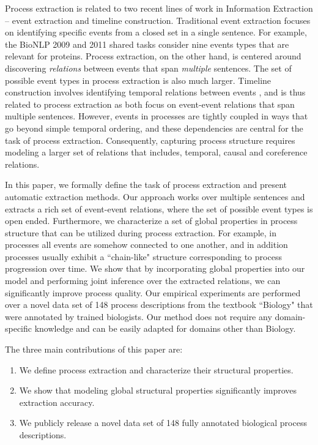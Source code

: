 Process extraction is related to two recent lines of work in Information Extraction -- event extraction and timeline construction.
Traditional event extraction focuses on identifying specific events from a closed set in a single sentence. 
For example, the BioNLP 2009 and 2011 shared tasks \cite{kim09,kim11} consider nine events types that are relevant for proteins.
Process extraction, on the other hand, is centered around discovering \emph{relations} between events that span \emph{multiple} sentences. The set of possible event types in process extraction is also much larger. Timeline construction involves identifying temporal relations between events \cite{Chambers08,Yoshikawa09,Denis11,Do12,Mcclosky12}, and is thus related to process extraction as both focus on event-event relations that span multiple sentences. However, events in processes are tightly coupled in ways that go beyond simple temporal ordering, and these dependencies are central for the task of process extraction. Consequently, capturing process structure requires modeling a larger set of relations that includes, temporal, causal and coreference relations.


In this paper, we formally define the task of process extraction and present automatic extraction methods. 
Our approach works over multiple sentences and extracts a rich set of event-event relations, where the set of possible event types is open ended. 
Furthermore, we characterize a set of global properties in process structure that can be utilized during process extraction. 
For example, in processes all events are somehow connected to one another, and in addition processes usually exhibit a ``chain-like" structure corresponding to process progression over time. 
We show that by incorporating global properties into our model and performing joint inference over the extracted relations, we can significantly improve process quality.  
Our empirical experiments are performed over a novel data set of 148 process descriptions from the textbook ``Biology" \cite{CampbellReece} that were annotated by trained biologists. Our method does not require any domain-specific knowledge and can be easily adapted for domains other than Biology.

The three main contributions of this paper are:
\begin{enumerate}[itemsep=0pt,topsep=0pt] 
\item We define process extraction and characterize their structural properties.
\item We show that modeling global structural properties significantly improves extraction accuracy.
\item  We publicly release a novel data set of 148 fully annotated biological process descriptions.
\end{enumerate}
